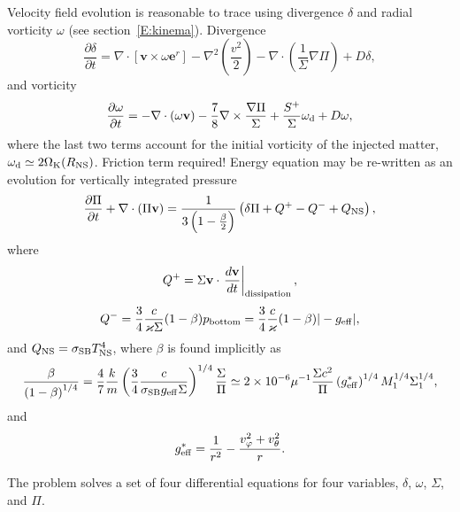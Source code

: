 \documentclass[usenatbib,onecolumn]{mnras}
\newcommand{\alert}[1]{\color{red} #1\color{black}}
\renewcommand{\vector}[1]{\ensuremath{\mathbf{#1}}}
\newcommand{\pardir}[2]{\ensuremath{\frac{\partial #2}{\partial #1} }}
\begin{document}
Velocity field evolution is reasonable to trace using divergence $\delta$ and
radial vorticity $\omega$ (see section~\ref{E:kinema}). Divergence
\begin{equation}\label{E:set:div}
\pardir{t}{\delta} = \nabla \cdot [\vector{v} \times  \omega \vector{e}^r] -
\nabla^2 \left(\frac{v^2}{2}\right) - \nabla \cdot \left( \frac{1}{\Sigma}
\nabla \Pi \right) + D\delta,
\end{equation}
and vorticity
\begin{equation}\label{E:set:vort}
\pardir{t}{\omega} = -\nabla \cdot (\omega \vector{v}) -
\frac{7}{8}\nabla \times \frac{\nabla \Pi}{\Sigma}+
\frac{S^+}{\Sigma} \omega_{\rm d} + D\omega,
\end{equation}
where the last two terms account for the initial vorticity of the injected
matter, $\omega_{\rm d} \simeq 2\Omega_{\rm K}(R_{\rm NS})$. \alert{Friction
  term required!}
Energy equation may be re-written as an evolution for vertically integrated
pressure
\begin{equation}\label{E:set:press}
\pardir{t}{\Pi} + \nabla \cdot \left( \Pi \vector{v}\right) = \frac{1}{3\left(
  1-\frac{\beta}{2}\right)} \left(\delta \Pi + Q^+ - Q^- + Q_{\rm NS}\right),
\end{equation}
where 
\begin{equation}\label{E:set:qplus}
Q^+ = \Sigma \vector{v} \cdot \left.\frac{d\vector{v}}{dt}\right|_{\rm dissipation},
\end{equation}
\begin{equation}\label{E:set:qminus}
Q^- = \frac{3}{4} \frac{c}{\varkappa \Sigma}(1-\beta) p_{\rm bottom} =
\frac{3}{4} \frac{c}{\varkappa} (1-\beta) |-g_{\rm eff}|,
\end{equation}
and $Q_{\rm NS} =  \sigma_{\rm SB} T_{\rm NS}^4$, where $\beta$ is found
implicitly as
\begin{equation}\label{E:set:beta}
\frac{\beta}{\left(1-\beta\right)^{1/4}} = \frac{4}{7} \frac{k}{m}
\left(\frac{3}{4}\frac{c}{\sigma_{\rm SB} g_{\rm eff} \Sigma} \right)^{1/4}
\frac{\Sigma}{\Pi} \simeq 2\times 10^{-6} \mu^{-1} \frac{\Sigma c^2}{\Pi}
\left(g_{\rm eff}^*\right)^{1/4} M_1^{1/4} \Sigma_1^{1/4},
\end{equation}
and 
\begin{equation}\label{E:set:gravity}
g_{\rm eff}^* = \frac{1}{r^2} - \frac{v_\varphi^2 + v_\theta^2}{r}.
\end{equation}

The problem solves a set of four differential equations for four variables,
$\delta$, $\omega$, $\Sigma$, and $\Pi$.
\end{document}

